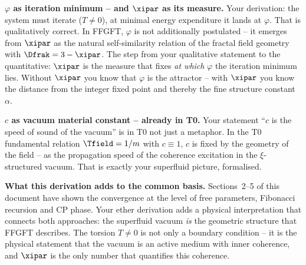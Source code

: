 \begin{response}
\medskip
\textbf{$\varphi$ as iteration minimum -- and $\xipar$ as its measure.}
Your derivation: the system must iterate ($T \neq 0$), at minimal energy expenditure it lands at $\varphi$. That is qualitatively correct. In FFGFT, $\varphi$ is not additionally postulated -- it emerges from $\xipar$ as the natural self-similarity relation of the fractal field geometry with $\Dfrak = 3 - \xipar$. The step from your qualitative statement to the quantitative: $\xipar$ is the measure that fixes \emph{at which} $\varphi$ the iteration minimum lies. Without $\xipar$ you know that $\varphi$ is the attractor -- with $\xipar$ you know the distance from the integer fixed point and thereby the fine structure constant $\alpha$.

\medskip
\textbf{$c$ as vacuum material constant -- already in T0.}
Your statement ``$c$ is the speed of sound of the vacuum'' is in T0 not just a metaphor. In the T0 fundamental relation $\Tfield = 1/m$ with $c \equiv 1$, $c$ is fixed by the geometry of the field -- as the propagation speed of the coherence excitation in the $\xi$-structured vacuum. That is exactly your superfluid picture, formalised.

\medskip
\textbf{What this derivation adds to the common basis.}
Sections~2--5 of this document have shown the convergence at the level of free parameters, Fibonacci recursion and CP phase. Your ether derivation adds a physical interpretation that connects both approaches: the superfluid vacuum \emph{is} the geometric structure that FFGFT describes. The torsion $T \neq 0$ is not only a boundary condition -- it is the physical statement that the vacuum is an active medium with inner coherence, and $\xipar$ is the only number that quantifies this coherence.

\begin{center}
\end{center}
\end{response}


